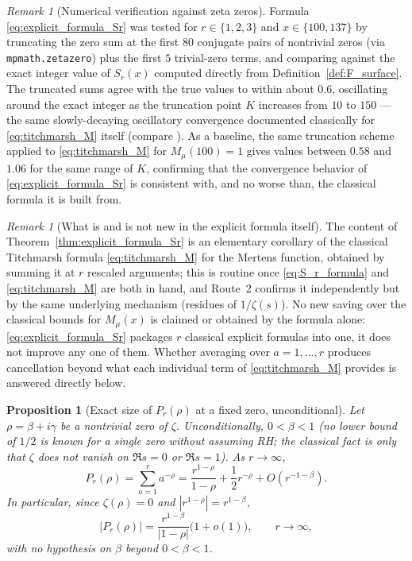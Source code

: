 \documentclass[11pt]{amsart}
\numberwithin{equation}{section}
\theoremstyle{plain}
\newtheorem{proposition}[theorem]{Proposition}
\theoremstyle{definition}
\theoremstyle{remark}
\newtheorem{remark}[theorem]{Remark}
\newcommand{\mob}{\mu}
\newcommand{\zetaR}{\zeta}
\begin{document}
\begin{remark}[Numerical verification against zeta zeros]
\label{rem:explicit_formula_numeric}
Formula \eqref{eq:explicit_formula_Sr} was tested for \(r\in\{1,2,3\}\) and \(x\in\{100,137\}\) by truncating the zero sum at the first \(80\) conjugate pairs of nontrivial zeros (via \texttt{mpmath.zetazero}) plus the first \(5\) trivial-zero terms, and comparing against the exact integer value of \(S_r(x)\) computed directly from Definition~\ref{def:F_surface}.  The truncated sums agree with the true values to within about \(0.6\), oscillating around the exact integer as the truncation point \(K\) increases from \(10\) to \(150\) — the same slowly-decaying oscillatory convergence documented classically for \eqref{eq:titchmarsh_M} itself (compare \cite{Titchmarsh1986}).  As a baseline, the same truncation scheme applied to \eqref{eq:titchmarsh_M} for \(M_\mob(100)=1\) gives values between \(0.58\) and \(1.06\) for the same range of \(K\), confirming that the convergence behavior of \eqref{eq:explicit_formula_Sr} is consistent with, and no worse than, the classical formula it is built from.
\end{remark}

\begin{remark}[What is and is not new in the explicit formula itself]
\label{rem:explicit_formula_honest}
The content of Theorem~\ref{thm:explicit_formula_Sr} is an elementary corollary of the classical Titchmarsh formula \eqref{eq:titchmarsh_M} for the Mertens function, obtained by summing it at \(r\) rescaled arguments; this is routine once \eqref{eq:S_r_formula} and \eqref{eq:titchmarsh_M} are both in hand, and Route~2 confirms it independently but by the same underlying mechanism (residues of \(1/\zetaR(s)\)).  No new saving over the classical bounds for \(M_\mob(x)\) is claimed or obtained by the formula alone: \eqref{eq:explicit_formula_Sr} packages \(r\) classical explicit formulas into one, it does not improve any one of them.  Whether averaging over \(a=1,\ldots,r\) produces cancellation beyond what each individual term of \eqref{eq:titchmarsh_M} provides is answered directly below.
\end{remark}

\begin{proposition}[Exact size of \(P_r(\rho)\) at a fixed zero, unconditional]
\label{prop:Pr_asymptotic}
Let \(\rho=\beta+i\gamma\) be a nontrivial zero of \(\zetaR\).  Unconditionally, \(0<\beta<1\) (no lower bound of \(1/2\) is known for a single zero without assuming RH; the classical fact is only that \(\zetaR\) does not vanish on \(\Re s=0\) or \(\Re s=1\)).  As \(r\to\infty\),
\begin{equation}
P_r(\rho)=\sum_{a=1}^r a^{-\rho}=\frac{r^{1-\rho}}{1-\rho}+\frac12 r^{-\rho}+O\!\left(r^{-1-\beta}\right).
\label{eq:Pr_asymptotic}
\end{equation}
In particular, since \(\zetaR(\rho)=0\) and \(|r^{1-\rho}|=r^{1-\beta}\),
\begin{equation}
|P_r(\rho)|=\frac{r^{1-\beta}}{|1-\rho|}\bigl(1+o(1)\bigr),
\qquad r\to\infty,
\label{eq:Pr_size}
\end{equation}
with no hypothesis on \(\beta\) beyond \(0<\beta<1\).
\end{proposition}
\end{document}
